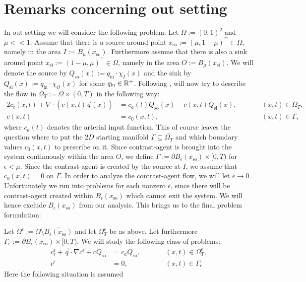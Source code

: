 \documentclass[paper=a4, fontsize=12pt,parskip=half,draft,headings=small]{scrartcl}
\newcommand{\qi}{q_{\mathrm{in}}}
\newcommand{\Qso}{Q_{\mathrm{so}}}
\newcommand{\Qsi}{Q_{\mathrm{si}}}
\newcommand{\q}{\vec{q}}
\newcommand{\xso}{x_\mathrm{so}}
\newcommand{\xsi}{x_\mathrm{si}}
\newcommand{\ce}{c^\epsilon}
\begin{document}
		
		\section{Remarks concerning out setting}
		
		\begin{remark}\label{rem:Equation}
			In out setting we will consider the following problem:
			Let $\Omega:=(0,1)^2$ and $\mu <<1$.
			Assume that there is a source around point $\xso:=(\mu,1-\mu)^\top \in \Omega$, namely in the area $I:=B_{\mu}(\xso)$.
			Furthermore assume that there is also a sink around point $\xsi:=(1-\mu,\mu)^\top \in \Omega$, namely in the area $O:=B_{\mu}(\xsi)$.
			We will denote the source by $\Qso(x):=\qi\cdot\chi_I(x)$ and the sink by $\Qsi(x):=\qi\cdot\chi_O(x)$ for some $\qi \in \R^+$.
			Following \cite{BergenMIC15}, will now try to describe the flow in $\Omega_T:=\Omega \times (0,T)$ in the following way:
			\begin{alignat*}{2}
				c_t(x,t) + \nabla \cdot \left(c(x,t)\q(x) \right) &= c_a(t)\Qso(x) - c(x,t)\Qsi(x), &\qquad  &(x,t) \in \Omega_T, \\
				c(x,t) &= c_0(x,t), && (x,t) \in \Gamma,
			\end{alignat*}
			where $c_a(t)$ denotes the arterial input function.
			This of course leaves the question where to put the $2D$ starting manifold $\Gamma \subseteq \overline{\Omega_T}$ and which boundary values $c_0(x,t)$ to prescribe on it.
			Since contrast-agent is brought into the system continuously within the area $O$, we define $\Gamma:= \partial B_\epsilon(\xso) \times [0,T)$ for $\epsilon < \mu$.
			Since the contrast-agent is created by the source at $I$, we assume that $c_0(x,t) = 0$ on $\Gamma$.
			In order to analyze the contrast-agent flow, we will let $\epsilon \to 0$.
			Unfortunately we run into problems for each nonzero $\epsilon$, since there will be contrast-agent created within $B_\epsilon(\xso)$ which cannot exit the system.
			We will hence exclude $B_\epsilon(\xso)$ from our analysis. This brings us to the final problem formulation:

			Let $\Omega^\epsilon:=\Omega \setminus \overline{B_\epsilon(\xso)}$ and let $\Omega^\epsilon_T$ be as above.
			Let furthermore $\Gamma_\epsilon:= \partial B_\epsilon(\xso) \times [0,T)$.
			We will study the following class of problems:
			\begin{subequations}
				\label{eq:ourProblem}
				\begin{alignat}{2}
					\ce_t + \q \cdot \nabla \ce + c\Qso &= c_a\Qso, &\qquad  &(x,t) \in \Omega_T^\epsilon, \label{eq:ourProblema} \\
					\ce &= 0, && (x,t) \in \Gamma_\epsilon \label{eq:ourProblemb}
				\end{alignat}
			\end{subequations}
			Here the following situation is assumed
			

\end{remark}
\end{document}
